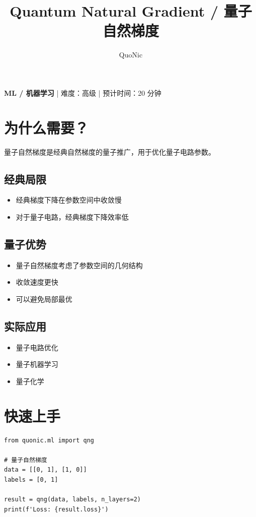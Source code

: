 \documentclass[12pt,a4paper]{article}
\title{Quantum Natural Gradient / 量子自然梯度}
\author{QuoNic}
\date{}
\begin{document}
\maketitle

\begin{center}
\textbf{ML / 机器学习} | 难度：高级 | 预计时间：20 分钟
\end{center}

\tableofcontents
\newpage

\section{为什么需要？}

量子自然梯度是经典自然梯度的量子推广，用于优化量子电路参数。

\subsection{经典局限}
\begin{itemize}
  \item 经典梯度下降在参数空间中收敛慢
  \item 对于量子电路，经典梯度下降效率低
\end{itemize}

\subsection{量子优势}
\begin{itemize}
  \item 量子自然梯度考虑了参数空间的几何结构
  \item 收敛速度更快
  \item 可以避免局部最优
\end{itemize}

\subsection{实际应用}
\begin{itemize}
  \item 量子电路优化
  \item 量子机器学习
  \item 量子化学
\end{itemize}

\section{快速上手}

\begin{verbatim}
from quonic.ml import qng

# 量子自然梯度
data = [[0, 1], [1, 0]]
labels = [0, 1]

result = qng(data, labels, n_layers=2)
print(f'Loss: {result.loss}')
\end{verbatim}
\end{document}
